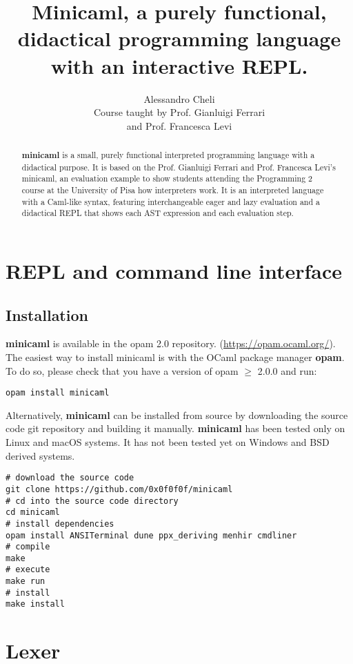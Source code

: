 \documentclass[12pt]{article}
\title{Minicaml, a purely functional, didactical programming language with an
interactive REPL.}
\author{Alessandro Cheli\\Course taught by Prof. Gianluigi Ferrari\\and Prof. Francesca Levi}
\begin{document}
\begin{titlingpage}
\maketitle

\begin{abstract}
\textbf{minicaml} is a small, purely functional interpreted programming language
with a didactical purpose. It is based on the Prof. Gianluigi Ferrari and Prof.
Francesca Levi's minicaml, an evaluation example to show students attending the
Programming 2 course at the University of Pisa how interpreters work. It is an
interpreted language with a Caml-like syntax, featuring interchangeable eager
and lazy evaluation and a didactical REPL that shows each AST expression and
each evaluation step.
\end{abstract}
\end{titlingpage}

\section{REPL and command line interface}
\subsection{Installation}
\textbf{minicaml} is available in the opam 2.0 repository.
(\url{https://opam.ocaml.org/}). The easiest way to install minicaml is with the
OCaml package manager \textbf{opam}. To do so, please check that you have a version of opam $\geq$
2.0.0 and run:
\begin{lstlisting}[style=bash]
opam install minicaml
\end{lstlisting}
Alternatively, \textbf{minicaml} can be installed from source by downloading the
source code git repository and building it manually. \textbf{minicaml} has been tested
only on Linux and macOS systems. It has not been tested yet on Windows and BSD
derived systems.
\begin{lstlisting}[style=bash]
# download the source code
git clone https://github.com/0x0f0f0f/minicaml
# cd into the source code directory
cd minicaml
# install dependencies
opam install ANSITerminal dune ppx_deriving menhir cmdliner
# compile
make
# execute
make run
# install
make install
\end{lstlisting}

\section{Lexer}
\end{document}
